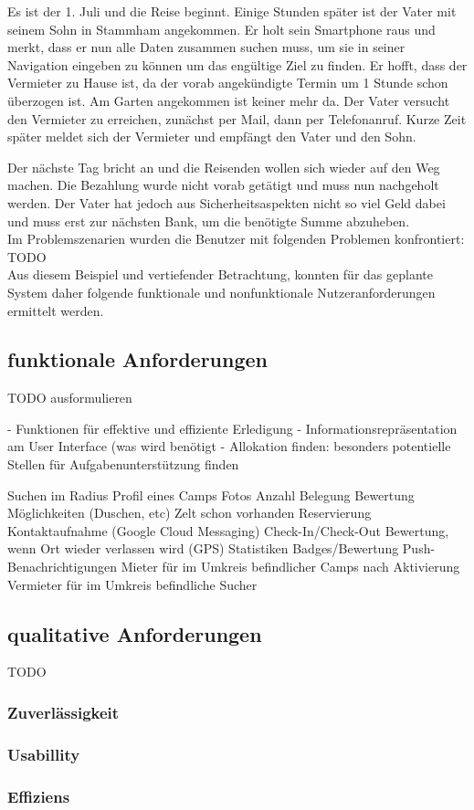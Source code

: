 Es ist der 1. Juli und die Reise beginnt. Einige Stunden später ist der Vater mit seinem Sohn in Stammham angekommen. Er holt sein Smartphone raus und merkt, dass er nun alle Daten zusammen suchen muss, um sie in seiner Navigation eingeben zu können um das engültige Ziel zu finden. Er hofft, dass der Vermieter zu Hause ist, da der vorab angekündigte Termin um 1 Stunde schon überzogen ist. Am Garten angekommen ist keiner mehr da. Der Vater versucht den Vermieter zu erreichen, zunächst per Mail, dann per Telefonanruf. Kurze Zeit später meldet sich der Vermieter und empfängt den Vater und den Sohn.

Der nächste Tag bricht an und die Reisenden wollen sich wieder auf den Weg machen. Die Bezahlung wurde nicht vorab getätigt und muss nun nachgeholt werden. Der Vater hat jedoch aus Sicherheitsaspekten nicht so viel Geld dabei und muss erst zur nächsten Bank, um die benötigte Summe abzuheben.\\

Im Problemszenarien wurden die Benutzer mit folgenden Problemen konfrontiert: 
TODO\\

Aus diesem Beispiel und vertiefender Betrachtung, konnten für das geplante System daher folgende funktionale und nonfunktionale Nutzeranforderungen ermittelt werden.
        	

\subsection{funktionale Anforderungen}        	

TODO ausformulieren


- Funktionen für effektive und effiziente Erledigung
- Informationsrepräsentation am User Interface (was wird benötigt
- Allokation finden: besonders potentielle Stellen für Aufgabenunterstützung finden


Suchen im Radius
Profil eines Camps
Fotos
Anzahl
Belegung
Bewertung
Möglichkeiten (Duschen, etc)
Zelt schon vorhanden
Reservierung
Kontaktaufnahme (Google Cloud Messaging)
Check-In/Check-Out
Bewertung, wenn Ort wieder verlassen wird (GPS)
Statistiken
Badges/Bewertung
Push-Benachrichtigungen
Mieter
für im Umkreis befindlicher Camps nach Aktivierung
Vermieter
für im Umkreis befindliche Sucher



\subsection{qualitative Anforderungen}   
TODO 
\subsubsection{Zuverlässigkeit}
\subsubsection{Usabillity}
\subsubsection{Effiziens}


